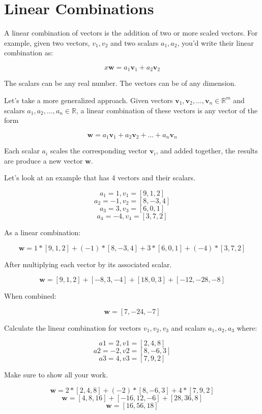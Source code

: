 \chapter{Linear Combinations}

A linear combination of vectors is the addition of two or more scaled vectors. For example, given two vectors, ${v}_1, {v}_2$ and two scalars $a_1,a_2$, you'd write their linear combination as:

\[x
\mathbf{w} = a_1\mathbf{v}_1 + a_2\mathbf{v}_2
\]

The scalars can be any real number. The vectors can be of any dimension. 

Let's take a more generalized approach. Given vectors $\mathbf{v}_1,
\mathbf{v}_2, ..., \mathbf{v}_n \in \mathbb{R}^m$ and scalars $a_1,
a_2, ..., a_n \in \mathbb{R}$, a linear combination of these vectors
is any vector of the form

\[
\mathbf{w} = a_1\mathbf{v}_1 + a_2\mathbf{v}_2 + ... + a_n\mathbf{v}_n
\]

Each scalar $a_i$ scales the corresponding vector $\mathbf{v}_i$, and
added together, the results are produce a new vector $\mathbf{w}$.

Let's look at an example that has 4 vectors and their scalars. 

$$a_1 = 1, v_1 = [9, 1, 2]$$
 $$a_2 = -1, v_2 = [8, -3, 4]$$
$$a_3 = 3, v_3 = [6, 0, 1]$$
$$a_4 = -4, v_4 = [3, 7, 2]$$

As a linear combination:

$$\mathbf{w} = 1*[9,1,2] + (-1)*[8, -3, 4]+ 3*[6,0,1] + (-4)*[3,7,2]$$

After multiplying each vector by its associated scalar.

$$\mathbf{w} = [9, 1, 2] + [-8, 3, -4] + [18, 0, 3] + [-12, -28, -8]$$

When combined:

$$\mathbf{w} = [7, -24, -7]$$


\begin{Exercise}[title={Linear Combination}, label=linearCombo]
Calculate the linear combination 
for vectors $v_1, v_2, v_3$ and
scalars $a_1, a_2,a_3$ where:   

$$a1 = 2, v1 =[2, 4, 8]$$
$$a2 = -2,v2 =[8, -6, 3]$$
$$a3 = 4,v3 =[7, 9, 2]$$

Make sure to show all your work. 
\end{Exercise}
\begin{Answer}[ref=linearCombo]
     \[
	\mathbf{w} = 2*[2,4,8] + (-2)*[8,-6,3] + 4*[7,9,2] 
	\]
  	\[
	\mathbf{w} = [4,8,16] + [-16,12,-6] + [28,36,8] 
	\]  
 	\[
	\mathbf{w} = [16, 56, 18]  
	\]   
\end{Answer}

